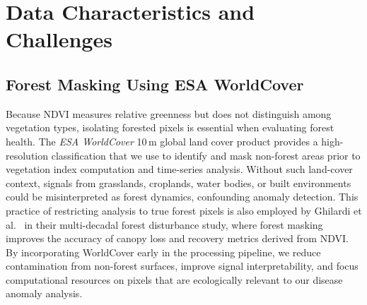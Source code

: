 \section{Data Characteristics and Challenges}

\subsection{Forest Masking Using ESA WorldCover}
Because NDVI measures relative greenness but does not distinguish among vegetation types, isolating forested pixels is essential when evaluating forest health. The \textit{ESA WorldCover} 10\,m global land cover product provides a high-resolution classification that we use to identify and mask non-forest areas prior to vegetation index computation and time-series analysis. Without such land-cover context, signals from grasslands, croplands, water bodies, or built environments could be misinterpreted as forest dynamics, confounding anomaly detection. This practice of restricting analysis to true forest pixels is also employed by Ghilardi et al.\ \cite{worldcover} in their multi-decadal forest disturbance study, where forest masking improves the accuracy of canopy loss and recovery metrics derived from NDVI. By incorporating WorldCover early in the processing pipeline, we reduce contamination from non-forest surfaces, improve signal interpretability, and focus computational resources on pixels that are ecologically relevant to our disease anomaly analysis.